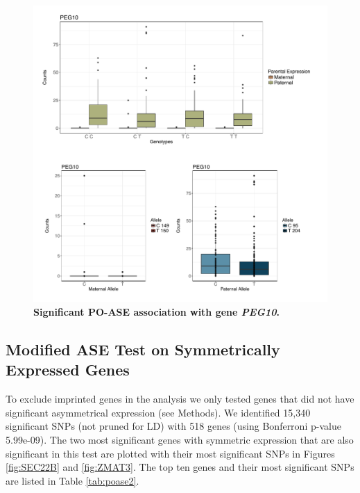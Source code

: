 \begin{figure}[!htb]
\centering \includegraphics[width=5in]{img/ch04/fig-11-PEG10.pdf}
\caption[Significant PO-ASE association with gene \emph{PEG10}.]{\textbf{Significant PO-ASE association with gene \emph{PEG10}.} }
\label{fig:PEG10}
\end{figure}
\clearpage

\subsection{Modified ASE Test on Symmetrically Expressed Genes}\label{Modified ASE Test on Symmetrically Expressed Genes} 
To exclude imprinted genes in the analysis we only tested genes that did not have significant asymmetrical expression (see Methods). We identified 15,340 significant SNPs (not pruned for LD) with 518 genes (using Bonferroni p-value 5.99e-09). The two most significant genes with symmetric expression that are also significant in this test are plotted with their most significant SNPs in Figures \ref{fig:SEC22B} and \ref{fig:ZMAT3}. The top ten genes and their most significant SNPs are listed in Table \ref{tab:poase2}.



